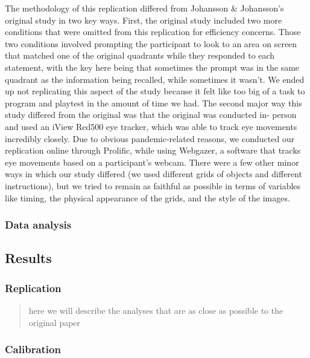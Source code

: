 \documentclass[
  english,
  man]{apa6}
\begin{document}
The methodology of this replication differed from Johansson \& Johansson's original study in two key ways. First, the original study included two more conditions that were omitted from this replication for efficiency concerns. Those two conditions involved prompting the participant to look to an area on screen that matched one of the original quadrants while they responded to each statement, with the key here being that sometimes the prompt was in the same quadrant as the information being recalled, while sometimes it wasn't. We ended up not replicating this aspect of the study because it felt like too big of a task to program and playtest in the amount of time we had. The second major way this study differed from the original was that the original was conducted in- person and used an iView Red500 eye tracker, which was able to track eye movements incredibly closely. Due to obvious pandemic-related reasons, we conducted our replication online through Prolific, while using Webgazer, a software that tracks eye movements based on a participant's webcam. There were a few other minor ways in which our study differed (we used different grids of objects and different instructions), but we tried to remain as faithful as possible in terms of variables like timing, the physical appearance of the grids, and the style of the images.

\hypertarget{data-analysis}{%
\subsubsection{Data analysis}\label{data-analysis}}

\hypertarget{results-1}{%
\subsection{Results}\label{results-1}}

\hypertarget{replication-1}{%
\subsubsection{Replication}\label{replication-1}}

\begin{quote}
here we will describe the analyses that are as close as possible to the original paper
\end{quote}

\hypertarget{calibration-1}{%
\subsubsection{Calibration}\label{calibration-1}}
\end{document}
